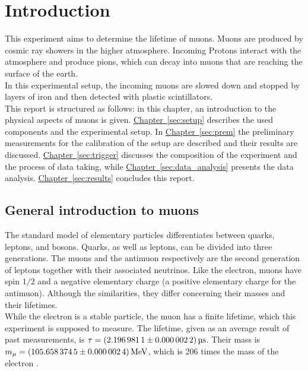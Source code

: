 \chapter{Introduction}
This experiment aims to determine the lifetime of muons. Muons are produced by cosmic ray showers in the higher atmosphere.
Incoming Protons interact with the atmosphere and produce pions, which can decay into muons that are reaching the surface of the earth. \\
In this experimental setup, the incoming muons are slowed down and stopped by layers of iron and then detected with plastic scintillators. \\
This report is structured as follows: in this chapter, an introduction to the physical aspects of muons is given.
\hyperref[sec:setup]{Chapter~\ref*{sec:setup}} describes the used components and the experimental setup. In \hyperref[sec:prem]{Chapter~\ref*{sec:prem}}
the preliminary measurements for the calibration of the setup are described and their results are discussed. \hyperref[sec:trigger]{Chapter~\ref*{sec:trigger}} discusses the composition of the experiment and the process of data taking, while \hyperref[sec:data_analysis]{Chapter~\ref*{sec:data_analysis}} presents the data analysis. \hyperref[sec:results]{Chapter~\ref*{sec:results}} concludes this report.

\newpage
\section{General introduction to muons}
The standard model of elementary particles differentiates between quarks, leptons, and bosons.
Quarks, as well as leptons, can be divided into three generations.
The muons and the antimuon respectively are the second generation of leptons together with their associated neutrinos.
Like the electron, muons have spin $1/2$ and a negative elementary charge (a positive elementary charge for the antimuon).
Although the similarities, they differ concerning their masses and their lifetimes. \\
While the electron is a stable particle, the muon has a finite lifetime, which this experiment is supposed to measure. 
The lifetime, given as an average result of past measurements, is $\tau = \SI{2.1969811 \pm 0.0000022}{\micro\second}$.
Their mass is $m_{\mu} = \SI{105.6583745 \pm 0.0000024}{\mega\eV}$, which is 206 times the mass of the electron \cite{pdg}.

